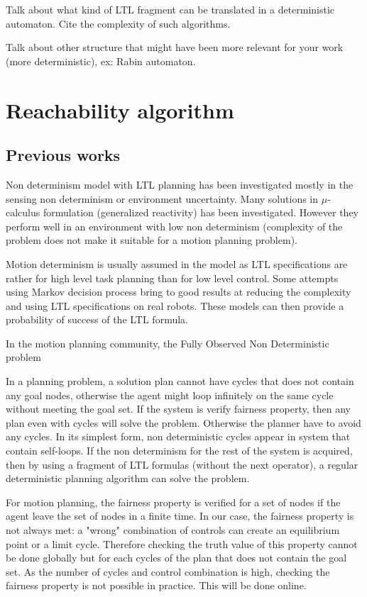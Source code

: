 Talk about what kind of LTL fragment can be translated in a deterministic \buchi{} automaton.
Cite the complexity of such algorithms.

Talk about other structure that might have been more relevant for your work (more deterministic), ex: Rabin automaton.

\section{Reachability algorithm}

\subsection{Previous works}
Non determinism model with LTL planning has been investigated mostly in the sensing non determinism or environment uncertainty.
Many solutions in $\mu$-calculus formulation (generalized reactivity) has been investigated. However they perform well in an environment with low non determinism (complexity of the problem does not make it suitable for a motion planning problem).

Motion determinism is usually assumed in the model as LTL specifications are rather for high level task planning than for low level control.
Some attempts using Markov decision process bring to good results at reducing the complexity and using LTL specifications on real robots. These models can then provide a probability of success of the LTL formula.

In the motion planning community, the Fully Observed Non Deterministic problem  

In a planning problem, a solution plan cannot have cycles that does not contain any goal nodes, otherwise the agent might loop infinitely on the same cycle without meeting the goal set. If the system is verify fairness property, then any plan even with cycles will solve the problem. Otherwise the planner have to avoid any cycles.
In its simplest form, non deterministic cycles appear in system that contain self-loops. If the non determinism for the rest of the system is acquired, then by using a fragment of LTL formulas (without the next operator), a regular deterministic planning algorithm can solve the problem.

For motion planning, the fairness property is verified for a set of nodes if the agent leave the set of nodes in a finite time.
In our case, the fairness property is not always met: a "wrong" combination of controls can create an equilibrium point or a limit cycle.
Therefore checking the truth value of this property cannot be done globally but for each cycles of the plan that does not contain the goal set.
As the number of cycles and control combination is high, checking the fairness property is not possible in practice. This will be done online.

